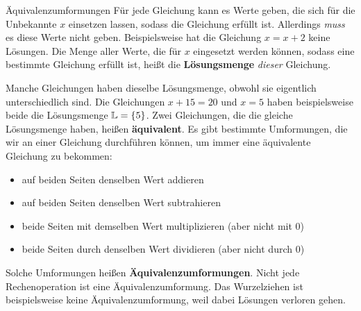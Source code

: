 \documentclass[../../main.tex]{subfiles}
\begin{document}
\begin{nutshell}{Äquivalenzumformungen}
    Für jede Gleichung kann es Werte geben, die sich für die Unbekannte $x$ einsetzen lassen, sodass die Gleichung erfüllt ist. Allerdings \emph{muss} es diese Werte nicht geben. Beispielsweise hat die Gleichung $x=x+2$ keine Lösungen. Die Menge aller Werte, die für $x$ eingesetzt werden können, sodass eine bestimmte Gleichung erfüllt ist, heißt die \textbf{Lösungsmenge} \Solutions \emph{dieser} Gleichung.
    
    Manche Gleichungen haben dieselbe Lösungsmenge, obwohl sie eigentlich unterschiedlich sind. Die Gleichungen $x+15=20$ und $x=5$ haben beispielsweise beide die Lösungsmenge $\mathbb{L}=\{5\}$. Zwei Gleichungen, die die gleiche Lösungsmenge haben, heißen \textbf{äquivalent}. Es gibt bestimmte Umformungen, die wir an einer Gleichung durchführen können, um immer eine äquivalente Gleichung zu bekommen:
    \begin{itemize}
        \item auf beiden Seiten denselben Wert addieren
        \item auf beiden Seiten denselben Wert subtrahieren
        \item beide Seiten mit demselben Wert multiplizieren (aber nicht mit 0)
        \item beide Seiten durch denselben Wert dividieren (aber nicht durch 0)
    \end{itemize}
    Solche Umformungen heißen \textbf{Äquivalenzumformungen}. Nicht jede Rechenoperation ist eine Äquivalenzumformung. Das Wurzelziehen ist beispielsweise keine Äquivalenzumformung, weil dabei Lösungen verloren gehen.
\end{nutshell}
\end{document}
